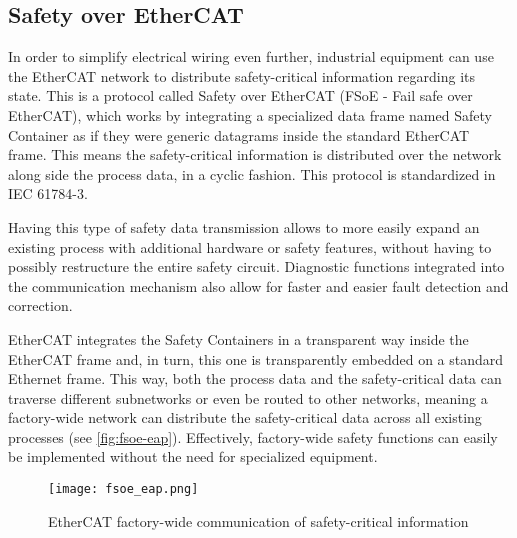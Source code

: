 \subsection{Safety over EtherCAT}

In order to simplify electrical wiring even further, industrial equipment can use the EtherCAT network to distribute safety-critical information regarding its state.
This is a protocol called Safety over EtherCAT (FSoE - Fail safe over EtherCAT), which works by integrating a specialized data frame named Safety Container as if they were generic datagrams inside the standard EtherCAT frame.
This means the safety-critical information is distributed over the network along side the process data, in a cyclic fashion.
This protocol is standardized in IEC 61784-3.

Having this type of safety data transmission allows to more easily expand an existing process with additional hardware or safety features, without having to possibly restructure the entire safety circuit.
Diagnostic functions integrated into the communication mechanism also allow for faster and easier fault detection and correction.

EtherCAT integrates the Safety Containers in a transparent way inside the EtherCAT frame and, in turn, this one is transparently embedded on a standard Ethernet frame.
This way, both the process data and the safety-critical data can traverse different subnetworks or even be routed to other networks, meaning a factory-wide network can distribute the safety-critical data across all existing processes (see \autoref{fig:fsoe-eap}).
Effectively, factory-wide safety functions can easily be implemented without the need for specialized equipment.

\begin{figure}[htp]
	\centering
	\texttt{[image: fsoe\_eap.png]}
	\caption{EtherCAT factory-wide communication of safety-critical information \cite{technology:fsoe}}
	\label{fig:fsoe-eap}
\end{figure}
